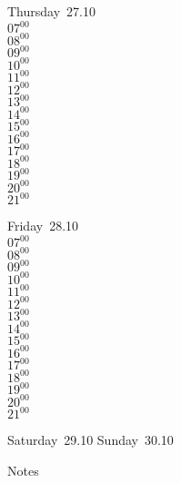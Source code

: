 \documentclass[11pt,a4paper]{book}\usepackage[]{graphicx}\usepackage[]{color}
\begin{document}
\clearpage
\begin{headerbox}
\end{headerbox}
\begin{weekdaybox}
  Thursday~27.10\\
  { 
  \vfill
  $07^{00}$\\
$08^{00}$\\
$09^{00}$\\
$10^{00}$\\
$11^{00}$\\
$12^{00}$\\
$13^{00}$\\
$14^{00}$\\
$15^{00}$\\
$16^{00}$\\
$17^{00}$\\
$18^{00}$\\
$19^{00}$\\
$20^{00}$\\
$21^{00}$\\
  }
\end{weekdaybox} 
\begin{weekdaybox}
  Friday~28.10\\
  { 
  \vfill
  $07^{00}$\\
$08^{00}$\\
$09^{00}$\\
$10^{00}$\\
$11^{00}$\\
$12^{00}$\\
$13^{00}$\\
$14^{00}$\\
$15^{00}$\\
$16^{00}$\\
$17^{00}$\\
$18^{00}$\\
$19^{00}$\\
$20^{00}$\\
$21^{00}$\\
  }
\end{weekdaybox}
\begin{weekendbox}
  Saturday~29.10
  \tcblower
  Sunday~30.10
\end{weekendbox} %
\begin{notebox}
  Notes
\end{notebox}
\clearpage
\end{document}
